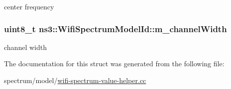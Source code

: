 center frequency 

\subsubsection[{\texorpdfstring{m\+\_\+channel\+Width}{m_channelWidth}}]{\setlength{\rightskip}{0pt plus 5cm}uint8\+\_\+t ns3\+::\+Wifi\+Spectrum\+Model\+Id\+::m\+\_\+channel\+Width}\hypertarget{structns3_1_1WifiSpectrumModelId_aecc22379b273cab991dc34387fa00ab7}{}\label{structns3_1_1WifiSpectrumModelId_aecc22379b273cab991dc34387fa00ab7}


channel width 



The documentation for this struct was generated from the following file\+:\begin{DoxyCompactItemize}
\item 
spectrum/model/\hyperlink{wifi-spectrum-value-helper_8cc}{wifi-\/spectrum-\/value-\/helper.\+cc}\end{DoxyCompactItemize}
